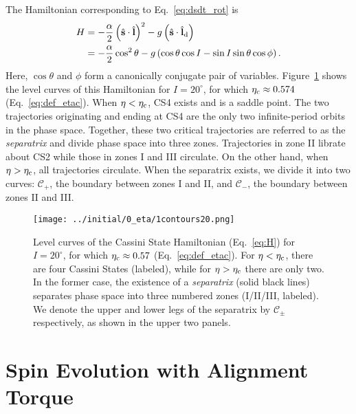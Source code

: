 \documentclass[
        fleqn,
        usenatbib,
    ]{mnras}
\newcommand*{\p}[1]{\left(#1\right)}
\newcommand*{\uv}[1]{\hat{\mathbf{#1}}}
\begin{document}
The Hamiltonian corresponding to Eq.~\eqref{eq:dsdt_rot} is
\begin{align}
    H &= -\frac{\alpha}{2}\p{\uv{s} \cdot \uv{l}}^2
            - g\p{\uv{s} \cdot \uv{l}_{\rm d}}\nonumber\\
        &= -\frac{\alpha}{2} \cos^2\theta
            - g\p{\cos\theta \cos I - \sin I \sin\theta \cos \phi}.\label{eq:H}
\end{align}
Here, $\cos \theta$ and $\phi$ form a canonically conjugate pair of variables.
Figure~\ref{fig:1contours} shows the level curves of this Hamiltonian for $I =
20^\circ$, for which $\eta_{\rm c} \approx 0.574$ (Eq.~\ref{eq:def_etac}). When $\eta
< \eta_{\rm c}$, CS4 exists and is a saddle point. The two trajectories
originating and ending at CS4 are the only two infinite-period orbits in the
phase space. Together, these two critical trajectories are referred to as the
\emph{separatrix} and divide phase space into three zones. Trajectories in zone
II librate about CS2 while those in zones I and III circulate. On the other
hand, when $\eta > \eta_{\rm c}$, all trajectories circulate. When the
separatrix exists, we divide it into two curves: $\mathcal{C}_+$, the boundary
between zones I and II, and $\mathcal{C}_-$, the boundary between zones II and
III\@.
\begin{figure}
    \centering
    \texttt{[image: ../initial/0\_eta/1contours20.png]}
    \caption{Level curves of the Cassini State Hamiltonian (Eq.~\ref{eq:H}) for
    $I = 20^\circ$, for which $\eta_{\rm c} \approx 0.57$
    (Eq.~\ref{eq:def_etac}). For $\eta < \eta_{\rm c}$, there are four Cassini
    States (labeled), while for $\eta > \eta_{\rm c}$ there are only two. In the
    former case, the existence of a \emph{separatrix} (solid black lines)
    separates phase space into three numbered zones (I/II/III, labeled). We
    denote the upper and lower legs of the separatrix by $\mathcal{C}_{\pm}$
    respectively, as shown in the upper two panels. }\label{fig:1contours}
\end{figure}

\section{Spin Evolution with Alignment Torque}\label{s:toy_model}
\end{document}
